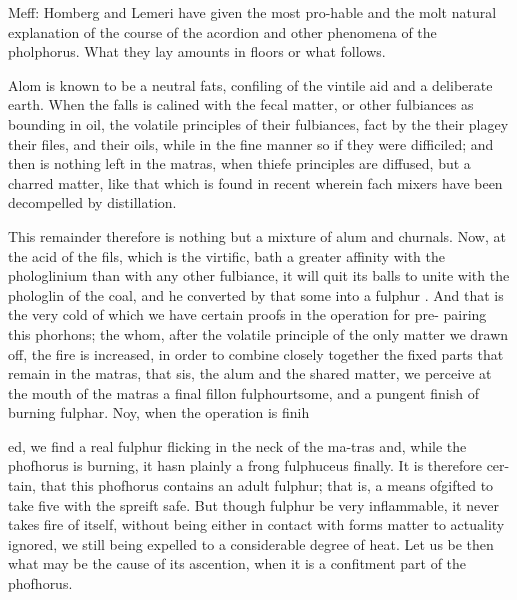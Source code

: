 Meff: Homberg and Lemeri have given the most pro-hable and the molt natural explanation of the course of the acordion and other phenomena of the pholphorus. What they lay amounts in floors or what follows.\par\medskip
Alom is known to be a neutral fats, confiling of the vintile aid and a deliberate earth. When the falls is calined with the fecal matter, or other fulbiances as bounding in oil, the volatile principles of their fulbiances, fact by the their plagey their files, and their oils, while in the fine manner so if they were difficiled; and then is nothing left in the matras, when thiefe principles are diffused, but a charred matter, like that which is found in recent wherein fach mixers have been decompelled by distillation.\par\medskip
This remainder therefore is nothing but a mixture of alum and churnals. Now, at the acid of the fils, which is the virtific, bath a greater affinity with the phologlinium than with any other fulbiance, it will quit its balls to unite with the phologlin of the coal, and he converted by that some into a fulphur . And that is the very cold of which we have certain proofs in the operation for pre- pairing this phorhons; the whom, after the volatile principle of the only matter we drawn off, the fire is increased, in order to combine closely together the fixed parts that remain in the matras, that sis, the alum and the shared matter, we perceive at the mouth of the matras a final fillon fulphourtsome, and a pungent finish of burning fulphar. Noy, when the operation is finih\par\medskip
ed, we find a real fulphur flicking in the neck of the ma-tras and, while the phofhorus is burning, it hasn plainly a frong fulphuceus finally. It is therefore cer-tain, that this phofhorus contains an adult fulphur; that is, a means ofgifted to take five with the spreift safe. But though fulphur be very inflammable, it never takes fire of itself, without being either in contact with forms matter to actuality ignored, we still being expelled to a considerable degree of heat. Let us be then what may be the cause of its ascention, when it is a confitment part of the phofhorus.\par\medskip
